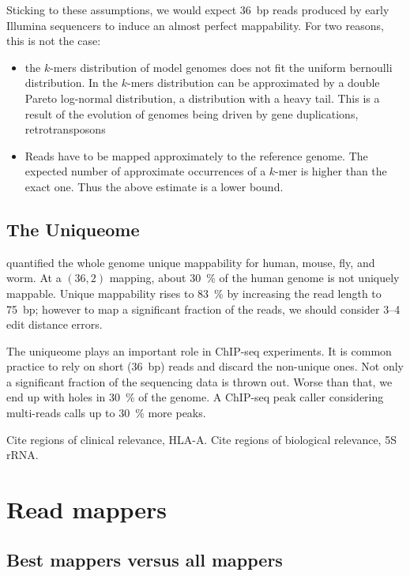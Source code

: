 Sticking to these assumptions, we would expect 36~bp reads produced by early Illumina sequencers to induce an almost perfect mappability. For two reasons, this is not the case:
\begin{itemize}
\item the $k$-mers distribution of model genomes does not fit the uniform bernoulli distribution.
In \cite{?} the $k$-mers distribution can be approximated by a double Pareto log-normal distribution, \ie a distribution with a heavy tail.
This is a result of the evolution of genomes being driven by gene duplications, retrotransposons \cite{?}

\item Reads have to be mapped approximately to the reference genome.
The expected number of approximate occurrences of a $k$-mer is higher than the exact one.
Thus the above estimate is a lower bound.
\end{itemize}

\subsection{The Uniqueome}

\citep{Derren2011} quantified the whole genome unique mappability for human, mouse, fly, and worm.
At a $(36,2)$ mapping, about 30~\% of the human genome is not uniquely mappable.
Unique mappability rises to 83~\% by increasing the read length to 75~bp; however to map a significant fraction of the reads, we should consider 3--4 edit distance errors.

\begin{center}

\end{center}

The uniqueome plays an important role in ChIP-seq experiments.
It is common practice \cite{?} to rely on short (36~bp) reads and discard the non-unique ones.
Not only a significant fraction of the sequencing data is thrown out.
Worse than that, we end up with holes in 30~\% of the genome.
A ChIP-seq peak caller considering multi-reads calls up to 30~\% more peaks.

Cite regions of clinical relevance, \eg HLA-A.
Cite regions of biological relevance, \eg 5S rRNA.


\section{Read mappers}

\subsection{Best mappers versus all mappers}

